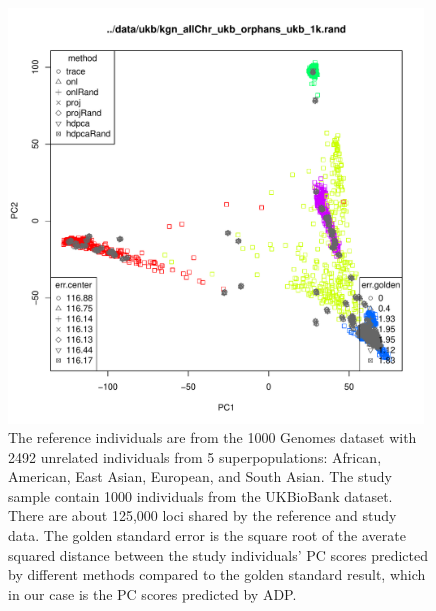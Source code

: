 \documentclass{article}
\begin{document}
\begin{figure}[p]
  \centering
  \includegraphics[width=0.98\textwidth]{ukb}
  \caption{
    The reference individuals are from the 1000 Genomes dataset with 2492 unrelated individuals from 5 superpopulations: African, American, East Asian, European, and South Asian. 
    The study sample contain 1000 individuals from the UKBioBank dataset.
    There are about 125,000 loci shared by the reference and study data.
    The golden standard error is the square root of the averate squared distance between the study individuals' PC scores predicted by different methods compared to the golden standard result, which in our case is the PC scores predicted by ADP.
  }
  \label{fig:ukb}
\end{figure}
\end{document}
